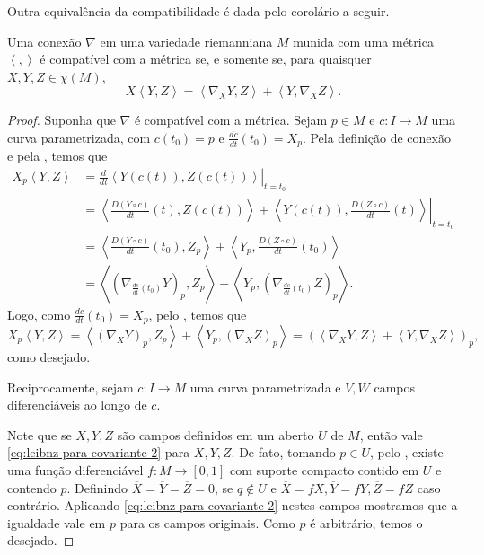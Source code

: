 Outra equivalência da compatibilidade é dada pelo corolário a seguir.
\begin{corollary}
	\label{cor:leibniz-direcional}
	Uma conexão $\nabla$ em uma variedade riemanniana $M$ munida com uma métrica $\left<,\right>$ é compatível com a métrica se, e somente se, para quaisquer $X, Y, Z \in \chi(M)$,
	\begin{equation}
		\label{eq:leibnz-para-covariante-2}
		X\left<Y,Z\right> =\left<\nabla_{X}Y,Z\right> +\left<Y,\nabla_{X}Z\right> .
	\end{equation}
	\begin{proof}

		Suponha que $\nabla$ é compatível com a métrica. Sejam $p \in M$ e $c:I\to M$ uma curva parametrizada, com $c(t_{0})=p$ e $\frac{dc}{dt}(t_{0})=X_{p}$. Pela definição de conexão e pela , temos que
		\begin{align*}
			X_{p}\left<Y,Z\right> & =\left.\frac{d}{dt}\left<Y(c(t)),Z(c(t))\right>\right|_{t=t_{0}}                                                                              \\
			                      & =\left<\left.\frac{D(Y \circ  c)}{dt}(t),Z(c(t))\right> +\left<Y(c(t)),\frac{D(Z \circ c)}{dt}(t)\right> \right|_{t=t_{0}}                    \\
			                      & =\left<\frac{D(Y \circ  c)}{dt}(t_{0}),Z_{p}\right> +\left<Y_{p},\frac{D(Z \circ c)}{dt}(t_{0})\right>                                        \\
			                      & = \left<\left( \nabla_{\frac{dc}{dt}(t_{0})}Y \right)_{p},Z_{p}\right> +\left<Y_{p},\left( \nabla_{\frac{dc}{dt}(t_{0})}Z \right)_{p}\right>.
		\end{align*}
		Logo, como $\frac{dc}{dt}(t_{0})=X_{p}$, pelo , temos que
		\begin{equation*}
			X_{p}\left<Y,Z\right> =\left<(\nabla_{X}Y)_{p},Z_{p}\right> + \left<Y_{p},(\nabla _{X}Z)_{p}\right> =(\left<\nabla_{X}Y,Z\right> +\left<Y,\nabla_{X}Z\right> )_{p},
		\end{equation*}
		como desejado.

		Reciprocamente, sejam $c:I\to M$ uma curva parametrizada e $V, W$ campos diferenciáveis ao longo de $c$.

		Note que se $X,Y,Z$ são campos definidos em um aberto $U$ de $M$, então vale \eqref{eq:leibnz-para-covariante-2} para $X,Y,Z$. De fato, tomando $p \in U$, pelo , existe uma função diferenciável $f:M\to [0,1]$ com suporte compacto contido em $U$ e contendo $p$. Definindo $\overline{X} =\overline{Y} =\overline{Z}=0$, se $q \not\in U$ e $\overline{X}=fX, \overline{Y}=fY, \overline{Z}=fZ$ caso contrário. Aplicando \eqref{eq:leibnz-para-covariante-2} nestes campos mostramos que a igualdade vale em $p$ para os campos originais. Como $p$ é arbitrário, temos o desejado.


\end{proof}
\end{corollary}
